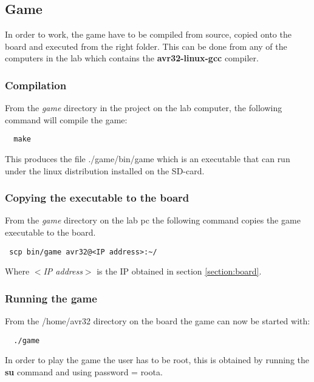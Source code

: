 \subsection{Game}

In order to work, the game have to be compiled from source, copied onto the board 
and executed from the right folder.
This can be done from any of the computers in the lab which contains the {\bf avr32-linux-gcc} compiler.

\subsubsection{Compilation}
From the {\it game} directory in the project on the lab computer, the following command will compile the game:
\begin{verbatim}
  make
\end{verbatim}
This produces the file ./game/bin/game which is an executable that can run under 
the linux distribution installed on the SD-card.

\subsubsection{Copying the executable to the board}
From the {\it game} directory on the lab pc the following command copies the game executable to the board.
\begin{verbatim}
 scp bin/game avr32@<IP address>:~/
\end{verbatim}
Where {\it $<$IP address$>$} is the IP obtained in section \ref{section:board}.

\subsubsection{Running the game}
From the /home/avr32 directory on the board the game can now be started with:
\begin{verbatim}
  ./game
\end{verbatim}
In order to play the game the user has to be root, this is obtained by 
running the {\bf su} command
and using password = roota.
